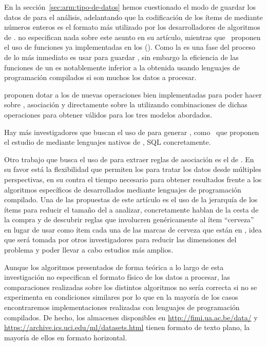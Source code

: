 En la sección~\ref{sec:arm:tipo-de-datos} hemos cuestionado el modo de guardar los datos de \D para el análisis, adelantando que la codificación de los ítems de \I mediante números enteros es el formato más utilizado por los desarrolladores de algoritmos de \ARM. \citet{AgrawalImielinskiSwami-MiningAssociationRulesBetweenSetsOfItemsInLargeDB-1993} no especifican nada sobre este asunto en su artículo, mientras que~\citet{HoutsmaSwami-SETMofAR-1993} proponen el uso de funciones ya implementadas en los \dbmss (\DBMS). Como la \arm es una fase del proceso de \KDD lo más inmediato es usar \dbs para guardar \D, sin embargo la eficiencia de las funciones de un \DBMS es notablemente inferior a la obtenida usando lenguajes de programación compilados si son muchos los datos a procesar.

\citet{AgrawalImielinskiSwami-DatabaseMiningAPerformancePerspective-1993} proponen dotar a los \DBMS de nuevas operaciones bien implementadas para poder hacer \dm sobre \clasificacion, {asociación} y \secuencias directamente sobre la \DB utilizando combinaciones de dichas operaciones para obtener \patrones válidos para los tres modelos abordados.

Hay más investigadores que buscan el uso de \DBMS para generar \ARs, como~\citet{HoutsmaSwami-SetOrientedMiningForAR-1995} que proponen el estudio de \ARM mediante lenguajes nativos de \dbs, SQL concretamente.

Otro trabajo que busca el uso de \DBMS para extraer reglas de asociación es el de \citet{HolsheimerKerstenMannilaToivonen-APerspectiveOnDatabasesAndDataMining-1995}. En su favor está la flexibilidad que permiten los \DBMS para tratar los datos desde múltiples perspectivas, en su contra el tiempo necesario para obtener resultados frente a los algoritmos específicos de \ARM desarrollados mediante lenguajes de programación compilado. Una de las propuestas de este artículo es el uso de la jerarquía de los ítems para reducir el tamaño del \dataset a analizar, concretamente hablan de la cesta de la compra y de descubrir reglas que involucren genéricamente al ítem "`cerveza"' en lugar de usar como ítem cada una de las marcas de cerveza que están en \I, idea que será tomada por otros investigadores para reducir las dimensiones del problema y poder llevar a cabo estudios más amplios.

Aunque los algoritmos presentados de forma teórica a lo largo de esta investigación no especifican el formato físico de los datos a procesar, las comparaciones realizadas sobre los distintos algoritmos no sería correcta si no se experimenta en condiciones similares por lo que en la mayoría de los casos encontraremos implementaciones realizadas con lenguajes de programación compilados. De hecho, los almacenes \D disponibles en \url{http://fimi.ua.ac.be/data/} y \url{https://archive.ics.uci.edu/ml/datasets.html} tienen formato de texto plano, la mayoría de ellos en formato horizontal.
